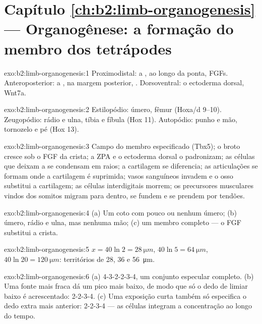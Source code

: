 \section*{Capítulo \ref{ch:b2:limb-organogenesis} --- Organogênese: a formação do membro dos tetrápodes}

\begin{solution}{exo:b2:limb-organogenesis:1}
Proximodistal: a , ao longo da ponta, FGFs.
Anteroposterior: a , na margem posterior,
. Dorsoventral: o ectoderma dorsal, Wnt7a.
\end{solution}

\begin{solution}{exo:b2:limb-organogenesis:2}
Estilopódio: úmero, fêmur (Hoxa/d 9--10). Zeugopódio: rádio e ulna,
tíbia e fíbula (Hox 11). Autopódio: punho e mão, tornozelo e pé
(Hox 13).
\end{solution}

\begin{solution}{exo:b2:limb-organogenesis:3}
Campo do membro especificado (Tbx5); o broto cresce sob o FGF da
crista; a ZPA e o ectoderma dorsal o padronizam; as células que deixam
a  se condensam em raios; a cartilagem se diferencia;
as articulações se formam onde a cartilagem é suprimida; vasos
sanguíneos invadem e o osso substitui a cartilagem; as células
interdigitais morrem; os precursores musculares vindos dos somitos
migram para dentro, se fundem e se prendem por tendões.
\end{solution}

\begin{solution}{exo:b2:limb-organogenesis:4}
(a) Um coto com pouco ou nenhum úmero; (b) úmero, rádio e ulna, mas
nenhuma mão; (c) um membro completo --- o FGF substitui a crista.
\end{solution}

\begin{solution}{exo:b2:limb-organogenesis:5}
$x = 40\ln 2 = \qty{28}{\micro m}$, $40\ln 5 = \qty{64}{\micro m}$,
$40\ln 20 = \qty{120}{\micro m}$: territórios de 28, 36 e
\qty{56}{\micro m}.
\end{solution}

\begin{solution}{exo:b2:limb-organogenesis:6}
(a) 4-3-2-2-3-4, um conjunto especular completo. (b) Uma fonte mais
fraca dá um pico mais baixo, de modo que só o dedo de limiar baixo é
acrescentado: 2-2-3-4. (c) Uma exposição curta também só especifica o
dedo extra mais anterior: 2-2-3-4 --- as células integram a
concentração ao longo do tempo.
\end{solution}

